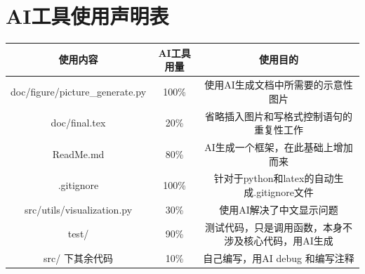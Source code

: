 \documentclass[UTF8]{ctexart}
\begin{document}
\section*{AI工具使用声明表}
\begin{table}[H]
    \centering
    \begin{tabular}{c|c|c}
        \hline
        使用内容 & AI工具用量 & 使用目的 \\ 
        \hline
        doc/figure/picture\_generate.py & 100\% & 使用AI生成文档中所需要的示意性图片 \\
        doc/final.tex & 20\% & 省略插入图片和写格式控制语句的重复性工作 \\ 
        ReadMe.md & 80\% & AI生成一个框架，在此基础上增加而来 \\
        .gitignore & 100\% & 针对于python和latex的自动生成.gitignore文件  \\
        src/utils/visualization.py & 30\% & 使用AI解决了中文显示问题 \\
        test/ & 90\% & 测试代码，只是调用函数，本身不涉及核心代码，用AI生成 \\
        src/ 下其余代码 & 10\% & 自己编写，用AI debug 和编写注释 \\
        \hline
    \end{tabular}
    \label{tab:AI_tools}
\end{table}


\newpage
\section*{}
\end{document}
